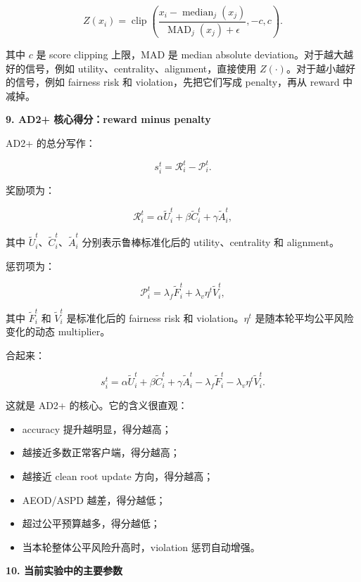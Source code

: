 \documentclass[11pt]{article}
\newcommand{\sectiontitle}[1]{%
  \vspace{0.7em}
  {\Large\bfseries\color{headblue} #1}\par
  \vspace{0.2em}
}
\begin{document}
\[
Z(x_i)
=
\operatorname{clip}
\left(
\frac{x_i-\operatorname{median}_j(x_j)}
{\operatorname{MAD}_j(x_j)+\epsilon},
-c,c
\right).
\tag{10}
\]

其中 $c$ 是 score clipping 上限，MAD 是 median absolute deviation。对于越大越好的信号，例如 utility、centrality、alignment，直接使用 $Z(\cdot)$。对于越小越好的信号，例如 fairness risk 和 violation，先把它们写成 penalty，再从 reward 中减掉。

\sectiontitle{9. AD2+ 核心得分：reward minus penalty}

AD2+ 的总分写作：

\[
s_i^t=\mathcal{R}_i^t-\mathcal{P}_i^t .
\tag{11}
\]

奖励项为：

\[
\mathcal{R}_i^t
=
\alpha \widetilde U_i^t
+
\beta \widetilde C_i^t
+
\gamma \widetilde A_i^t ,
\tag{12}
\]

其中 $\widetilde U_i^t$、$\widetilde C_i^t$、$\widetilde A_i^t$ 分别表示鲁棒标准化后的 utility、centrality 和 alignment。

惩罚项为：

\[
\mathcal{P}_i^t
=
\lambda_f \widetilde F_i^t
+
\lambda_v \eta^t \widetilde V_i^t ,
\tag{13}
\]

其中 $\widetilde F_i^t$ 和 $\widetilde V_i^t$ 是标准化后的 fairness risk 和 violation。$\eta^t$ 是随本轮平均公平风险变化的动态 multiplier。

合起来：

\[
s_i^t
=
\alpha \widetilde U_i^t
+
\beta \widetilde C_i^t
+
\gamma \widetilde A_i^t
-
\lambda_f \widetilde F_i^t
-
\lambda_v \eta^t \widetilde V_i^t .
\tag{14}
\]

这就是 AD2+ 的核心。它的含义很直观：

\begin{itemize}
  \item accuracy 提升越明显，得分越高；
  \item 越接近多数正常客户端，得分越高；
  \item 越接近 clean root update 方向，得分越高；
  \item AEOD/ASPD 越差，得分越低；
  \item 超过公平预算越多，得分越低；
  \item 当本轮整体公平风险升高时，violation 惩罚自动增强。
\end{itemize}

\sectiontitle{10. 当前实验中的主要参数}
\end{document}
